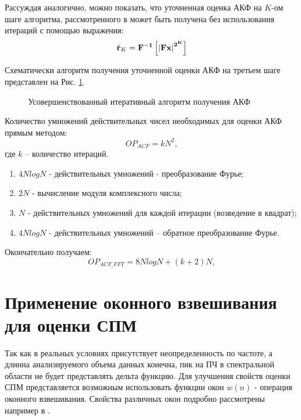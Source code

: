 Рассуждая аналогично, можно показать, что уточненная оценка АКФ на ${K}$-ом шаге алгоритма, рассмотренного в \cite{ostanin_akf}
может быть получена без использования итераций с помощью выражения:
\begin{equation}
	\label{eq:akf_3}
	\hat{\bf{r}}_K = \bf{F}^{-1}\left[ \left| \bf{Fx} \right| ^{2^K} \right]
\end{equation}

Схематически алгоритм получения уточненной оценки АКФ на третьем шаге представлен на Рис. \ref{pic:akf_pic}.

\begin{figure}[h]
	\center{}
	\caption{Усовершенствованный итеративный алгоритм получения АКФ}
	\label{pic:akf_pic}
\end{figure}

Количество умножений действительных чисел необходимых для оценки АКФ прямым методом: 
\begin{equation}
	\label{eq:num_of_op_acf}
	OP_{ACF}=kN^2,
\end{equation}
где ${k}$  – количество итераций.

\begin{enumerate}
\item ${4NlogN}$ - действительных умножений - преобразование Фурье;
\item ${2N}$ - вычисление модуля комплексного числа;
\item ${N}$ - действительных умножений для каждой итерации (возведение в квадрат);
\item ${4NlogN}$ - действительных умножений – обратное преобразование Фурье. 
\end{enumerate}

Окончательно получаем:
\begin{equation}
	\label{eq:num_of_op_acf}
	OP_{ACF\_FFT}=8NlogN + (k+2)N,
\end{equation}

\section{Применение оконного взвешивания для оценки СПМ}

Так как в реальных условиях присутствует неопределенность по частоте, а длинна анализируемого объема данных конечна, пик на ПЧ в спектральной области не будет
представлять дельта функцию. Для улучшения свойств оценки СПМ представляется возможным использовать функции окон ${w(n)}$ - операция оконного взвешивания.
Свойства различных окон подробно рассмотрены например в \cite{shahtarin-spectrum-book, bolshakov-book}.


